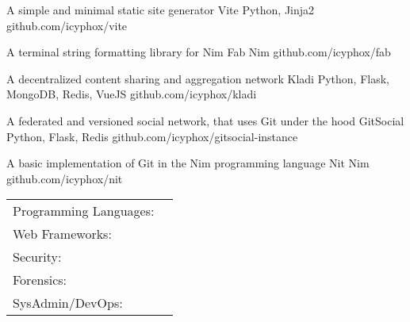 \documentclass[]{awesome-cv}
\begin{document}
\begin{cventries}
	\cventry
	{A simple and minimal static site generator}
	{Vite}
	{Python, Jinja2}
	{github.com/icyphox/vite}
	{}
	
	\vspace{-5mm}
	\cventry
	{A terminal string formatting library for Nim}
	{Fab}
	{Nim}
	{github.com/icyphox/fab}
	{}

	\vspace{-5mm}
	\cventry
	{A decentralized content sharing and aggregation network}
	{Kladi}
	{Python, Flask, MongoDB, Redis, VueJS}
	{github.com/icyphox/kladi}
	{}

	\vspace{-5mm}
	\cventry
	{A federated and versioned social network, that uses Git under the hood}
	{GitSocial}
	{Python, Flask, Redis}
	{github.com/icyphox/gitsocial-instance}
	{}

	\vspace{-5mm}
	\cventry
	{A basic implementation of Git in the Nim programming language}  
	{Nit}
	{Nim}
	{github.com/icyphox/nit}
	{}
	
	\vspace{-5mm}

\end{cventries}

\begin{cventries}
	\cventry
	{}
	{\def\arraystretch{1.15}{\begin{tabular}{ l l }
		Programming Languages:  & {\skill{ Python, Shell, Nim, C, JS, PHP, HTML/CSS}} \\
		Web Frameworks:  & {\skill{ Flask, Angular2, Hugo, Bootstrap, Materialize/MDL}} \\
		Security: & {\skill{ Vulnerability Assessment, Web Security, Penetration Testing, Networking}} \\
		Forensics: & {\skill{ Filesystems, Data Recovery}} \\
		SysAdmin/DevOps:  & {\skill{ Unix tools/CLI, AWS, Digital Ocean, Git, TravisCI}} \\
		\end{tabular}}}
	{}
	{}
	{}
\end{cventries}
\end{document}
